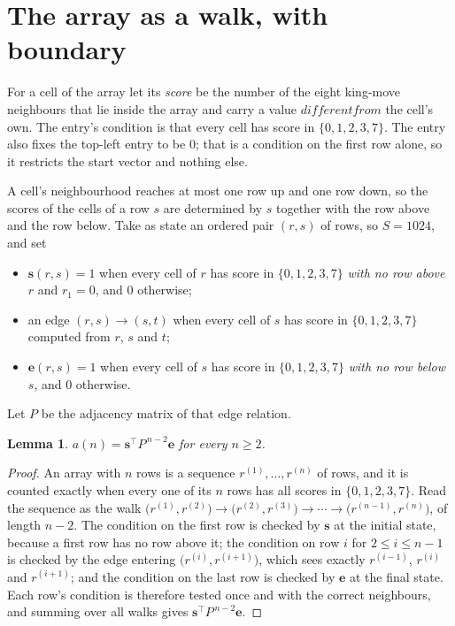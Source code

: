 \documentclass[11pt,a4paper]{article}
\theoremstyle{plain}
\newtheorem{lemma}[theorem]{Lemma}
\theoremstyle{definition}
\begin{document}
\section{The array as a walk, with boundary}

For a cell of the array let its \emph{score} be the number of the eight king-move neighbours that lie inside
the array and carry a value $different from$ the cell's own. The entry's condition is that every cell
has score in $\{0,1,2,3,7\}$. The entry also fixes the top-left entry to be $0$; that is a condition on the first row alone, so it restricts the start vector and nothing else.

A cell's neighbourhood reaches at most one row up and one row down, so the scores of the
cells of a row $s$ are determined by $s$ together with the row above and the row below.
Take as state an ordered pair $(r,s)$ of rows, so $S=1024$, and set
\begin{itemize}
\item $\mathbf{s}(r,s)=1$ when every cell of $r$ has score in $\{0,1,2,3,7\}$ \emph{with no row
above $r$} and $r_1=0$, and $0$ otherwise;
\item an edge $(r,s)\to(s,t)$ when every cell of $s$ has score in $\{0,1,2,3,7\}$ computed from
$r$, $s$ and $t$;
\item $\mathbf{e}(r,s)=1$ when every cell of $s$ has score in $\{0,1,2,3,7\}$ \emph{with no row
below $s$}, and $0$ otherwise.
\end{itemize}
Let $P$ be the adjacency matrix of that edge relation.

\begin{lemma}\label{lem:walk}
$a(n)=\mathbf{s}^{\!\top}P^{\,n-2}\mathbf{e}$ for every $n\ge2$.
\end{lemma}

\begin{proof}
An array with $n$ rows is a sequence $r^{(1)},\dots,r^{(n)}$ of rows, and it is counted
exactly when every one of its $n$ rows has all scores in $\{0,1,2,3,7\}$. Read the sequence as the
walk $\bigl(r^{(1)},r^{(2)}\bigr)\to\bigl(r^{(2)},r^{(3)}\bigr)\to\cdots\to
\bigl(r^{(n-1)},r^{(n)}\bigr)$, of length $n-2$. The condition on the first row is
checked by $\mathbf{s}$ at the initial state, because a first row has no row above it; the
condition on row $i$ for $2\le i\le n-1$ is checked by the edge entering
$\bigl(r^{(i)},r^{(i+1)}\bigr)$, which sees exactly $r^{(i-1)}$, $r^{(i)}$ and
$r^{(i+1)}$; and the condition on the last row is checked by $\mathbf{e}$ at the final
state. Each row's condition is therefore tested once and with the correct neighbours, and
summing over all walks gives $\mathbf{s}^{\!\top}P^{\,n-2}\mathbf{e}$.
\end{proof}
\end{document}
